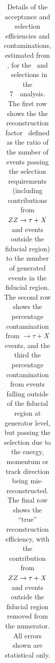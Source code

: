 \begin{table}[htbp]
\begin{tabular}{p{3.5cm}llll}
	\hline\hline
    \end{tabular}
    \caption[Details of the acceptance and selection
    efficiencies and contaminations, estimated from \mc, for the \ZZ\ and \ZZs\
    selections in the 7~\tev\ analysis.]{Details of the acceptance and selection
    efficiencies and contaminations, estimated from \mc, for the \ZZ\ and \ZZs\
    selections in the 7~\tev\ analysis. The first row shows the the
    reconstruction factor \CZZ\, defined as the ratio of the number of events
    passing the selection requirements (including contributions from $ZZ
    \rightarrow \tau+X$ and events outside the fiducial region) to the number
    of generated events in the fiducial region.  The second row shows the
    percentage contamination from $\rightarrow \tau+X$ events, and the third
    the percentage contamination from events falling outside of the fiducial
    region at generator level, but passing the selection due to the energy,
    momentum or track direction being mis-reconstructed.  The final row shows
    the ``true'' reconstruction efficiency, with the contribution from $ZZ
    \rightarrow \tau+X$ and events outside the fiducial region removed from the
    numerator.  All errors shown are statistical only.}
    \label{table:objSel-czz-seven}
\end{table}

